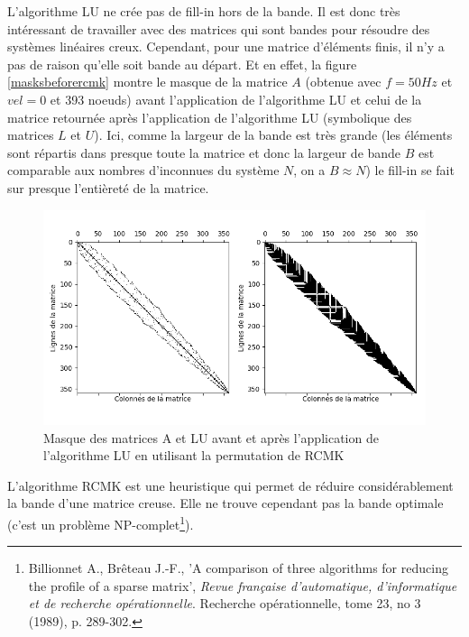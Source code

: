 \documentclass[11pt]{article}
\begin{document}
L'algorithme LU ne crée pas de fill-in hors de la bande. Il est donc très intéressant de travailler avec des matrices qui sont bandes pour résoudre des systèmes linéaires creux. Cependant, pour une matrice d'éléments finis, il n'y a pas de raison qu'elle soit bande au départ. Et en effet, la figure \ref{masksbeforercmk} montre le masque de la matrice $A$ (obtenue avec $f=50Hz$ et $vel = 0$ et 393 noeuds) avant l'application de l'algorithme LU et celui de la matrice retournée après l'application de l'algorithme LU (symbolique des matrices $L$ et $U$). Ici, comme la largeur de la bande est très grande (les éléments sont répartis dans presque toute la matrice et donc la largeur de bande $B$ est comparable aux nombres d'inconnues du système $N$, on a $B \approx N$) le fill-in se fait sur presque l'entièreté de la matrice. \\
\vspace{-8pt}


\begin{figure}
    \centering
    \includegraphics[width=\linewidth]{mask_matrices_with_rcmk.png}
    \vspace{-1.5cm}
    \caption{Masque des matrices A et LU avant et après l'application de l'algorithme LU en utilisant la permutation de RCMK}
    \label{masksafterrcmk}

\end{figure}

L'algorithme RCMK est une heuristique qui permet de réduire considérablement la bande d'une matrice creuse. Elle ne trouve cependant pas la bande optimale (c'est un problème NP-complet\footnote{Billionnet A., Brêteau J.-F., 'A comparison of three algorithms for reducing the profile of a sparse matrix', \textit{
Revue française d’automatique, d’informatique et de recherche opérationnelle}. Recherche opérationnelle, tome 23, no 3 (1989), p. 289-302.}). \\
\vspace{-8pt}
\end{document}
